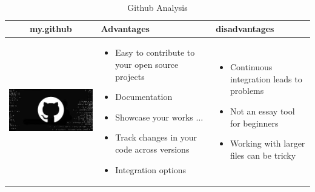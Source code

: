 \documentclass{article}
\begin{document}
	
\begin{table}[h!]
	\centering
	\begin{tabular}{ | c | m{5cm} | m{5cm} | }
		\hline
		my.github & Advantages & disadvantages \\ \hline
		\begin{minipage}{.4\textwidth}
			\includegraphics[width=\linewidth, height=40mm]{github}
		\end{minipage}
	    &
	    \begin{itemize}
	    	\item Easy to contribute to your open source projects
	    	\item Documentation
	    	\item Showcase your works $\ldots$
	    	\item Track changes in your code across versions
	    	\item Integration options
	    \end{itemize}
      &
      \begin{itemize}
      	\item Continuous integration leads to problems
      	\item Not an essay tool for beginners
      	\item Working with larger files can be tricky
      	\end{itemize}
      \\ \hline
    \end{tabular}
    \caption{Github Analysis}\label{tbl:mygithub}
\end{table}
\end{document}
